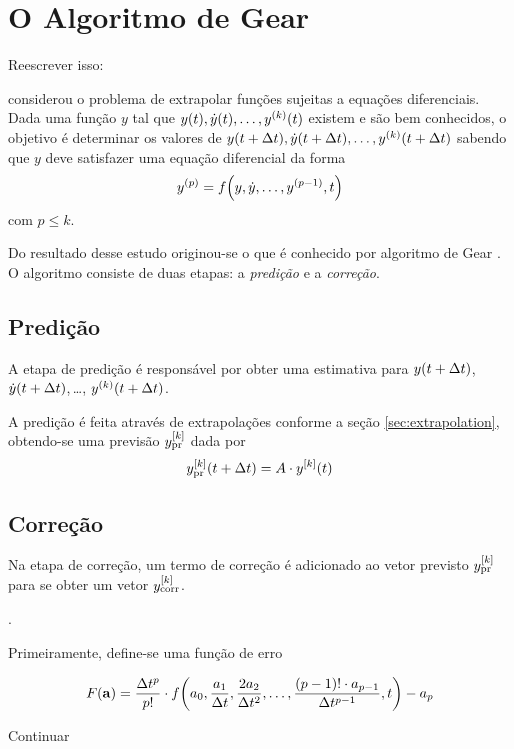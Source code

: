 \section{O Algoritmo de Gear} \label{sec:gear_integration_scheme}

\alert{Reescrever isso:}

 considerou o problema de extrapolar funções sujeitas a equações diferenciais. Dada uma função \(y\) tal que \(y(t), \deriv{1}{y}(t),\dots, \deriv{k}{y}(t)\) existem e são bem conhecidos, o objetivo é determinar os valores de \(y(t + \Dt), \deriv{1}{y}(t + \Dt),\dots, \deriv{k}{y}(t + \Dt)\) sabendo que \(y\) deve satisfazer uma equação diferencial da forma
\begin{equation} \label{eq:gear_diff}
	\deriv{p}{y} = f\pqty{y, \deriv{1}{y},\dots,\deriv{p-1}{y}, t}
\end{equation}
com \(p \leq k\).

Do resultado desse estudo originou-se o que é conhecido por algoritmo de Gear . O algoritmo consiste de duas etapas: a \textit{predição} e a \textit{correção}.

\subsection{Predição}

A etapa de predição é responsável por obter uma estimativa para \(y(t + \Delta t)\), \(\deriv{1}{y}(t + \Dt)\),\,\dots, \(\deriv{k}{y}(t + \Dt)\).

A predição é feita através de extrapolações conforme a seção \ref{sec:extrapolation}, obtendo-se uma previsão \(\drvec{k}{\predicted{y}}\) dada por
\[\drvec{k}{\predicted{y}}\pqty{t+\Dt} = A\cdot\drvec{k}{y}\pqty{t}\]

\subsection{Correção}

Na etapa de correção, um termo de correção é adicionado ao vetor previsto \(\drvec{k}{\predicted{y}}\) para se obter um vetor \(\drvec{k}{\corrected{y}}\).

.

Primeiramente, define-se uma função de erro

\begin{equation*}
  F\pqty{\vec{a}} = \dfrac{\Dt^p}{p!}\cdot f\pqty{a_0, \dfrac{a_1}{\Dt}, \dfrac{2a_2}{\Dt^2},\dots,\dfrac{\pqty{p-1}!\cdot a_{p-1}}{\Dt^{p-1}}, t} - a_p
\end{equation*}

\alert{Continuar}
 
